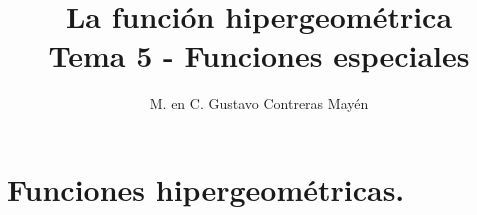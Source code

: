 
\title{La función hipergeométrica \\ \large {Tema 5 - Funciones especiales} \vspace{-3ex}}
\author{M. en C. Gustavo Contreras Mayén}
\date{ }

\vspace{-4cm}
\maketitle
\fontsize{14}{14}\selectfont
\tableofcontents
\newpage

\section{Funciones hipergeométricas.}

